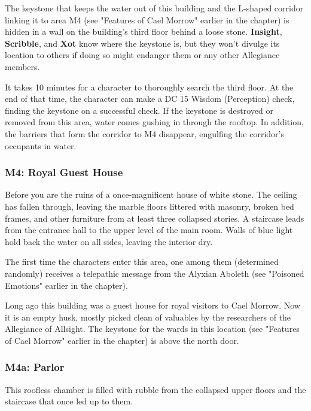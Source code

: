 \documentclass[a4paper, 11pt, bg=full, twocolumn, nooutline]{dndbook}
\begin{document}
The keystone that keeps the water out of this building and the L-shaped corridor linking it to area M4 (see "Features of Cael Morrow" earlier in the chapter) is hidden in a wall on the building's third floor behind a loose stone. \textbf{Insight}, \textbf{Scribble}, and \textbf{Xot} know where the keystone is, but they won't divulge its location to others if doing so might endanger them or any other Allegiance members.

It takes 10 minutes for a character to thoroughly search the third floor. At the end of that time, the character can make a DC 15 Wisdom (Perception) check, finding the keystone on a successful check. If the keystone is destroyed or removed from this area, water comes gushing in through the rooftop. In addition, the barriers that form the corridor to M4 disappear, engulfing the corridor's occupants in water.

\subsubsection{M4: Royal Guest House}

\begin{DndReadAloud}
Before you are the ruins of a once-magnificent house of white stone. The ceiling has fallen through, leaving the marble floors littered with masonry, broken bed frames, and other furniture from at least three collapsed stories. A staircase leads from the entrance hall to the upper level of the main room. Walls of blue light hold back the water on all sides, leaving the interior dry.
\end{DndReadAloud}

The first time the characters enter this area, one among them (determined randomly) receives a telepathic message from the Alyxian Aboleth (see "Poisoned Emotions" earlier in the chapter).

Long ago this building was a guest house for royal visitors to Cael Morrow. Now it is an empty husk, mostly picked clean of valuables by the researchers of the Allegiance of Allsight. The keystone for the wards in this location (see "Features of Cael Morrow" earlier in the chapter) is above the north door.

\subsubsection{M4a: Parlor}

This roofless chamber is filled with rubble from the collapsed upper floors and the staircase that once led up to them.
\end{document}
